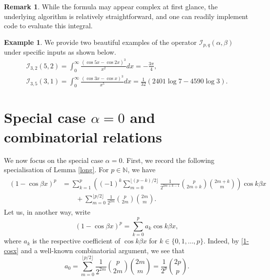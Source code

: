 \documentclass[12pt, reqno]{amsart}
\theoremstyle{plain}
\theoremstyle{definition}
\newtheorem{example}[theorem]{Example}
\newtheorem{remark}[theorem]{Remark}
\begin{document}
\begin{remark}
While the formula may appear complex at first glance, the underlying algorithm is relatively straightforward, and one can readily implement code to evaluate this integral.
\end{remark}

\begin{example}
    We provide two beautiful examples of the operator $\mathcal{I}_{p ,q}(\alpha, \beta)$ under specific inputs as shown below.
    \begin{gather*}
        \mathcal{I}_{3, 2}(5, 2)=\int_0^{\infty}\frac{(\cos 5x-\cos 2x)^3}{x^2}dx=-\frac{3\pi}{4},\\
        \mathcal{I}_{3, 5}(3, 1)=\int_0^{\infty}\frac{(\cos 3x-\cos x)^3}{x^5}dx=\frac{1}{32}(2401\log 7-4590\log 3).
    \end{gather*}
\end{example}

\section{Special case $\alpha=0$ and combinatorial relations}\label{sec5}

We now focus on the special case $\alpha=0$. First, we record the following specialisation of Lemma \ref{long}. For $p\in\mathbb{N}$, we have
		\begin{align}\label{1-cosx}
        \begin{split}
						        (1-\cos \beta x)^p&=\sum_{k=1}^p\left((-1)^k\sum_{m=0}^{\lfloor (p-k)/2\rfloor}\frac{1}{2^{2m+k-1}}{p\choose 2m+k}{2m+k\choose m}\right)\cos k \beta x\\
            &\qquad+\sum_{m=0}^{\lfloor p/2\rfloor}\frac{1}{2^{2m}}{p\choose 2m}{2m\choose m}.
        \end{split}
		\end{align}
Let us, in another way, write
\begin{equation}\label{anotherwaytowrite}
    (1-\cos \beta x)^p=\sum_{k=0}^pa_k\cos k\beta x,
\end{equation}
where $a_k$ is the respective coefficient of $\cos k\beta x$ for $k\in\{0,1,\ldots,p\}$.
Indeed, by \eqref{1-cosx} and a well-known combinatorial argument, we see that
\begin{equation}\label{a0}
    a_0=\sum_{m=0}^{\lfloor p/2\rfloor}\frac{1}{2^{2m}}\binom{p}{2m}\binom{2m}{m}=\frac{1}{2^p}\binom{2p}{p}.
\end{equation}
\end{document}

